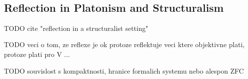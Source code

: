 
 
 


\

\subsection{Reflection in Platonism and Structuralism}
TODO cite "reflection in a structuralist setting"

TODO veci o tom, ze reflexe je ok protoze reflektuje veci ktere objektivne plati, protoze plati pro V ...

TODO souvislost s kompaktnosti, hranice formalich systemu nebo alespon ZFC



